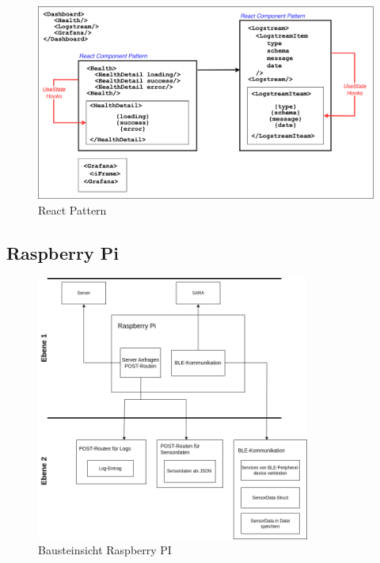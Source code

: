\documentclass[
]{article}
\begin{document}
\begin{figure}[H]
	\centering
	\includegraphics[width=140mm]{resources/reactpatternfe.drawio.png}
	\caption{React Pattern}
	\label{fig:ReactPattern}
\end{figure}

\subsection{Raspberry Pi}
\begin{figure}[H]
	\centering
	\includegraphics[width=90mm]{resources/ADABausteinsicht.png}
	\caption{Bausteinsicht Raspberry PI}
	\label{fig:BausteinRaspberry}
\end{figure}  
\end{document}
